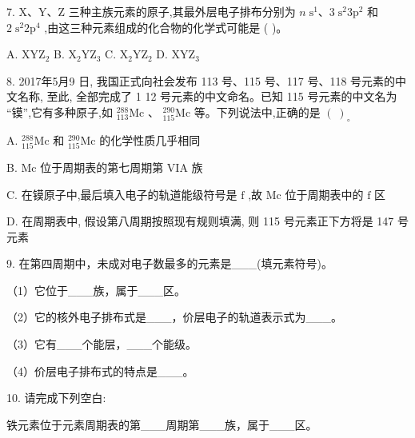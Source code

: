 \documentclass[10pt]{article}
\begin{document}
7. \(\mathrm{X}\text{、}\mathrm{Y}\text{、}\mathrm{Z}\) 三种主族元素的原子,其最外层电子排布分别为 \(n{\mathrm{\;s}}^{1}\text{、}3{\mathrm{\;s}}^{2}3{\mathrm{p}}^{2}\) 和 \(2{\mathrm{\;s}}^{2}2{\mathrm{p}}^{4}\) ,由这三种元素组成的化合物的化学式可能是 ( )。

A. \({\mathrm{{XYZ}}}_{2}\) B. \({\mathrm{X}}_{2}{\mathrm{{YZ}}}_{3}\) C. \({\mathrm{X}}_{2}{\mathrm{{YZ}}}_{2}\) D. \({\mathrm{{XYZ}}}_{3}\)

8. 2017年5月9 日, 我国正式向社会发布 113 号、115 号、117 号、118 号元素的中文名称, 至此, 全部完成了 1 12 号元素的中文命名。已知 115 号元素的中文名为 “镆”,它有多种原子,如 \({}_{113}^{288}\mathrm{{Mc}}\) 、 \({}_{115}^{290}\mathrm{{Mc}}\) 等。下列说法中,正确的是 \({\left( \;\right) }_{ \circ }\)

A. \({}_{115}^{288}\mathrm{{Mc}}\) 和 \({}_{115}^{290}\mathrm{{Mc}}\) 的化学性质几乎相同

B. \(\mathrm{{Mc}}\) 位于周期表的第七周期第 \(\mathrm{{VIA}}\) 族

C. 在镆原子中,最后填入电子的轨道能级符号是 \(\mathrm{f}\) ,故 \(\mathrm{{Mc}}\) 位于周期表中的 \(\mathrm{f}\) 区

D. 在周期表中, 假设第八周期按照现有规则填满, 则 115 号元素正下方将是 147 号元素

9. 在第四周期中，未成对电子数最多的元素是\_\_\_(填元素符号)。

（1）它位于\_\_\_族，属于\_\_\_区。

（2）它的核外电子排布式是\_\_\_，价层电子的轨道表示式为\_\_\_。

（3）它有\_\_\_个能层，\_\_\_个能级。

（4）价层电子排布式的特点是\_\_\_。

10. 请完成下列空白:

\begin{center}
\end{center}

铁元素位于元素周期表的第\_\_\_周期第\_\_\_族，属于\_\_\_区。
\end{document}
